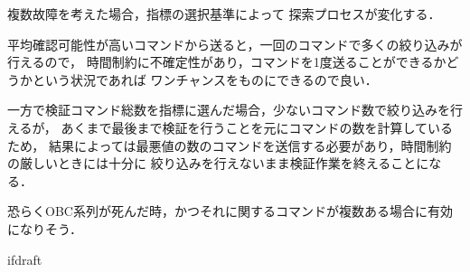 \documentclass[11pt]{jsreport}
\begin{document}
複数故障を考えた場合，指標の選択基準によって
探索プロセスが変化する．



平均確認可能性が高いコマンドから送ると，一回のコマンドで多くの絞り込みが行えるので，
時間制約に不確定性があり，コマンドを1度送ることができるかどうかという状況であれば
ワンチャンスをものにできるので良い．

一方で検証コマンド総数を指標に選んだ場合，少ないコマンド数で絞り込みを行えるが，
あくまで最後まで検証を行うことを元にコマンドの数を計算しているため，
結果によっては最悪値の数のコマンドを送信する必要があり，時間制約の厳しいときには十分に
絞り込みを行えないまま検証作業を終えることになる．

恐らくOBC系列が死んだ時，かつそれに関するコマンドが複数ある場合に有効になりそう．



\expandafter\ifx\csname ifdraft\endcsname\relax
  
\end{document}
